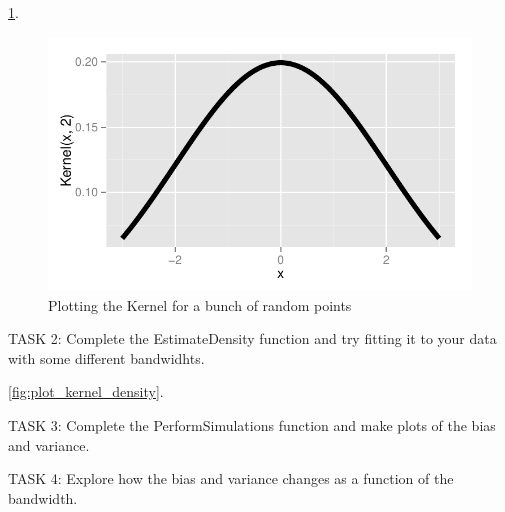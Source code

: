 \documentclass{article}\usepackage[]{graphicx}\usepackage[]{color}
\makeatletter
\def\maxwidth{ %
  \ifdim\Gin@nat@width>\linewidth
    \linewidth
  \else
    \Gin@nat@width
  \fi
}
\newenvironment{kframe}{%
 \def\at@end@of@kframe{}%
 \ifinner\ifhmode%
  \def\at@end@of@kframe{\end{minipage}}%
  \begin{minipage}{\columnwidth}%
 \fi\fi%
 \def\FrameCommand##1{\hskip\@totalleftmargin \hskip-\fboxsep
 \colorbox{shadecolor}{##1}\hskip-\fboxsep
     \hskip-\linewidth \hskip-\@totalleftmargin \hskip\columnwidth}%
 \MakeFramed {\advance\hsize-\width
   \@totalleftmargin\z@ \linewidth\hsize
   \@setminipage}}%
 {\par\unskip\endMakeFramed%
 \at@end@of@kframe}
\newenvironment{knitrout}{}{} %
\makeatother
\begin{document}
\ref{fig:plot_kernel}.
\begin{knitrout}
\color{fgcolor}\begin{figure}[h!]


{\centering \includegraphics[width=\maxwidth]{figure/plot_kernel} 

}

\caption[Plotting the Kernel for a bunch of random points]{Plotting the Kernel for a bunch of random points\label{fig:plot_kernel}}
\end{figure}


\end{knitrout}

TASK 2: Complete the EstimateDensity function and try fitting it to your data with some different bandwidhts.

\ref{fig:plot_kernel_density}.
\begin{knitrout}
\color{fgcolor}\begin{kframe}


{\ttfamily\noindent\bfseries\color{errorcolor}{\#\# Error: Aesthetics must either be length one, or the same length as the dataProblems:EstimateDensity(x, Kernel, 2)}}\end{kframe}
\end{knitrout}

TASK 3: Complete the PerformSimulations function and make plots of the bias and variance.

TASK 4: Explore how the bias and variance changes as a function of the bandwidth.
\end{document}
